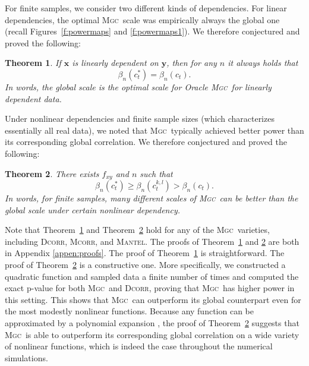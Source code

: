 \documentclass[11pt]{article}
\providecommand{\sct}[1]{{\normalfont\textsc{#1}}}
\providecommand{\mb}[1]{\boldsymbol{#1}}
\newcommand{\G}{c}
\newcommand{\Mgc}{\sct{Mgc}}
\newcommand{\Dcorr}{\sct{Dcorr}}
\newcommand{\Mcorr}{\sct{Mcorr}}
\newcommand{\Mantel}{\sct{Mantel}}
\newtheorem{thm}{Theorem}
\begin{document}
% 
For finite samples, we consider two different kinds of dependencies.
For linear dependencies,  the optimal \Mgc~scale was empirically always the global one (recall Figures~\ref{f:powermaps} and \ref{f:powermaps1}). We therefore conjectured and proved the following:
\begin{thm}
\label{t:linear}
If $\mb{x}$ is linearly dependent on $\mb{y}$, then for any $n$ it always holds that
\begin{equation}
\beta_n(\G_t^*) = \beta_n(\G_t).
\end{equation}
In words, the global scale is the optimal scale for Oracle \Mgc~for linearly dependent data.
\end{thm}

Under nonlinear dependencies and finite sample sizes (which characterizes essentially all real data), we noted that \Mgc~typically achieved better power than its corresponding global correlation. 
We therefore conjectured and proved the following:
\begin{thm}
\label{t:non}
There exists $f_{xy}$ and $n$ such that
\begin{equation}
\beta_n(\G_t^*) \geq \beta_n(\G^{k,l}_{t}) > \beta_n(\G_{t}).
\end{equation}
In words, for finite samples, many different scales of \Mgc~can be better than the global scale under certain nonlinear dependency.
\end{thm}
Note that Theorem~\ref{t:linear} and Theorem~\ref{t:non} hold for any of the \Mgc~varieties, including  \Dcorr, \Mcorr, and \Mantel.
%
The proofs of Theorem~\ref{t:linear} and \ref{t:non} are both in Appendix \ref{appen:proofs}.  The proof of Theorem~\ref{t:linear} is straightforward.  The proof of Theorem~\ref{t:non} is a constructive one. More specifically, we constructed a quadratic function and sampled data a finite number of times and computed the exact p-value for both \Mgc~and \Dcorr, proving that \Mgc~has higher power in this setting. This shows that \Mgc~can outperform its global counterpart even for the most modestly nonlinear functions.  Because any function can be approximated by a polynomial expansion \cite{RudinBook}, the proof of Theorem~\ref{t:non} suggests that \Mgc~is able to outperform its corresponding global correlation on a wide variety of nonlinear functions, which is indeed the case throughout the numerical simulations. %
\end{document}
